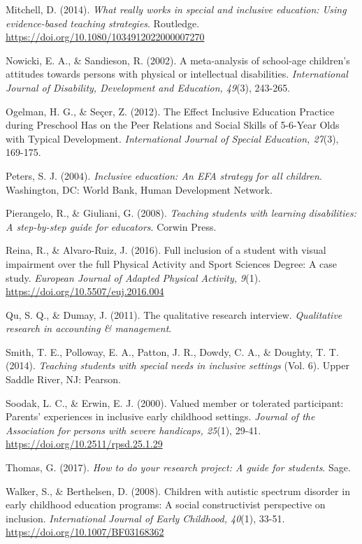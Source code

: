\documentclass[11.5pt]{sig-alternate}
\begin{document}
\begin{large}
Mitchell, D. (2014). \textit{What really works in special and inclusive education: Using evidence-based teaching strategies}. Routledge. \url{https://doi.org/10.1080/1034912022000007270}

Nowicki, E. A., \& Sandieson, R. (2002). A meta-analysis of school-age children's attitudes towards persons with physical or intellectual disabilities.\textit{ International Journal of Disability, Development and Education, 49}(3), 243-265.

Ogelman, H. G., \& Seçer, Z. (2012). The Effect Inclusive Education Practice during Preschool Has on the Peer Relations and Social Skills of 5-6-Year Olds with Typical Development. \textit{International Journal of Special Education, 27}(3), 169-175.

Peters, S. J. (2004). \textit{Inclusive education: An EFA strategy for all children}. Washington, DC: World Bank, Human Development Network.

Pierangelo, R., \& Giuliani, G. (2008). \textit{Teaching students with learning disabilities: A step-by-step guide for educators}. Corwin Press.

Reina, R., \& Alvaro-Ruiz, J. (2016). Full inclusion of a student with visual impairment over the full Physical Activity and Sport Sciences Degree: A case study. \textit{European Journal of Adapted Physical Activity, 9}(1). \url{https://doi.org/10.5507/euj.2016.004}

Qu, S. Q., \& Dumay, J. (2011). The qualitative research interview. \textit{Qualitative research in accounting \& management}. 

Smith, T. E., Polloway, E. A., Patton, J. R., Dowdy, C. A., \& Doughty, T. T. (2014). \textit{Teaching students with special needs in inclusive settings} (Vol. 6). Upper Saddle River, NJ: Pearson.

Soodak, L. C., \& Erwin, E. J. (2000). Valued member or tolerated participant: Parents' experiences in inclusive early childhood settings. \textit{Journal of the Association for persons with severe handicaps, 25}(1), 29-41. \url{https://doi.org/10.2511/rpsd.25.1.29}

Thomas, G. (2017). \textit{How to do your research project: A guide for students}. Sage.

Walker, S., \& Berthelsen, D. (2008). Children with autistic spectrum disorder in early childhood education programs: A social constructivist perspective on inclusion. \textit{International Journal of Early Childhood, 40}(1), 33-51. \url{https://doi.org/10.1007/BF03168362}


\end{large}
\end{document}
